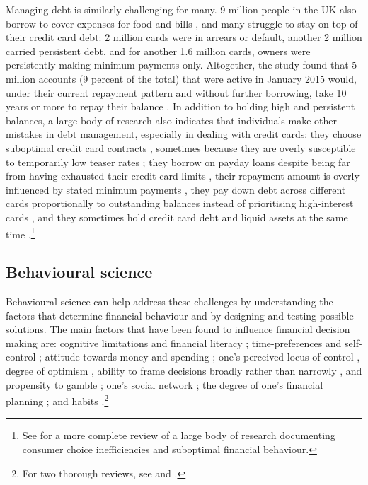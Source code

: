 Managing debt is similarly challenging for many. 9 million people in the UK
also borrow to cover expenses for food and bills \citep{mps2018building}, and
many struggle to stay on top of their credit card debt: 2 million cards were in
arrears or default, another 2 million carried persistent debt, and for another
1.6 million cards, owners were persistently making minimum payments only.
Altogether, the study found that 5 million accounts (9 percent of the total)
that were active in January 2015 would, under their current repayment pattern
and without further borrowing, take 10 years or more to repay their balance
\citep{fca2016credit}. In addition to holding high and persistent balances, a
large body of research also indicates that individuals make other mistakes in
debt management, especially in dealing with credit cards: they choose
suboptimal credit card contracts \citep{agarwal2015consumers}, sometimes
because they are overly susceptible to temporarily low teaser rates
\citep{shui2004time, ausubel1991failure}; they borrow on payday loans despite
being far from having exhausted their credit card limits
\citep{agarwal2009payday}, their repayment amount is overly influenced by
stated minimum payments \citep{sakaguchi2022default}, they pay down debt across
different cards proportionally to outstanding balances instead of prioritising
high-interest cards \citep{gathergood2019individuals}, and they sometimes hold
credit card debt and liquid assets at the same time \citep{gross2002liquidity,
    gathergood2020co}.\footnote{See \citet{agarwal2017shapes} for a more
    complete review of a large body of research documenting consumer choice
inefficiencies and suboptimal financial behaviour.} 


\subsection{Behavioural science}%
\label{sub:role_of_behavioural_science}

Behavioural science can help address these challenges by understanding the
factors that determine financial behaviour and by designing and testing
possible solutions. The main factors that have been found to influence
financial decision making are: cognitive limitations and financial literacy
\citep{agarwal2009age, agarwal2013cognitive, korniotis2011older,
    agarwal2010learning, fernandes2014financial, jorring2020financial};
    time-preferences and self-control \citep{frederick2002time,
    read2018intertemporal, ericson2019intertemporal, cohen2020measuring};
    attitude towards money and spending \citep{rick2008tightwads,
    rick2011fatal}; one's perceived locus of control \citep{perry2005control},
    degree of optimism \citep{puri2007optimism}, ability to frame decisions
    broadly rather than narrowly \citep{kumar2008decision}, and propensity to
    gamble \citep{kumar2009gambles}; one's social network
    \citep{bailey2018economic, kuchler2021social}; the degree of one's financial
    planning \citep{ameriks2003wealth}; and habits
    \citep{blumenstock2018defaults, schaner2018persistent,
        de2013deposit}.\footnote{For two thorough reviews, see
    \citet{agarwal2017shapes} and \citet{greenberg2019financial}.}

